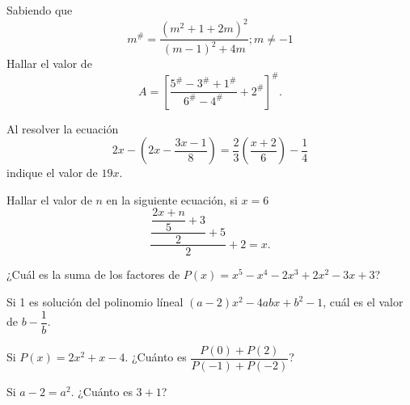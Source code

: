 \begin{section-problem}
    Sabiendo que
    \[
        m^{\#} = \frac{(m^2 + 1 + 2m)^2}{(m - 1)^2 + 4m}; m \neq -1
    \]
    Hallar el valor de
    \[A =  \left[\frac{5^{\#} - 3^{\#} + 1^{\#}}{6^{\#} - 4^{\#}} + 2^{\#}\right]^{\#}.\]
\end{section-problem}

\begin{section-problem}
    Al resolver la ecuación
    \[2x - \left( 2x - \frac{3x - 1}{8} \right) = \frac{2}{3} \left( \frac{x + 2}{6} \right) - \frac{1}{4}\]
    indique el valor de $19x$.
\end{section-problem}

\begin{section-problem}
    Hallar el valor de $n$ en la siguiente ecuación, si $x = 6$
    \[\dfrac{\dfrac{\dfrac{2x + n}{5} + 3}{2} + 5}{2} + 2 = x.\]
\end{section-problem}

\begin{section-problem}
    ¿Cuál es la suma de los factores de $P(x) = x^5 - x^4 - 2x^3 + 2x^2 - 3x + 3$?
\end{section-problem}

\begin{section-problem}
    Si 1 es solución del polinomio líneal $(a - 2)x^2 - 4abx + b^2 - 1$, cuál es el valor de $b - \dfrac{1}{b}$.
\end{section-problem}

\begin{problem}
    Si $P(x) = 2x^2 + x - 4$.
    ¿Cuánto es $\dfrac{P(0) + P(2)}{P(-1) + P(-2)}$?
\end{problem}

\begin{problem}
    Si $\boxed{a - 2} =  a^2$.
    ¿Cuánto es $\boxed{3} +\boxed{\boxed{1}}$?
\end{problem}